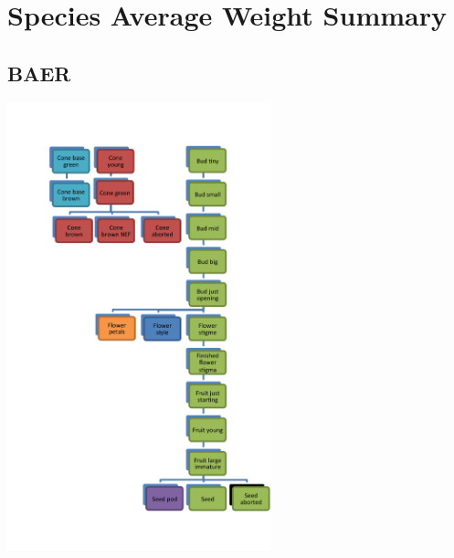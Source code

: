 \documentclass[10pt]{book} %
\begin{document}
\chapter{Species Average Weight Summary}
\newpage
\footnotesize



\clearpage
\newpage
\section{BAER}
\begin{multicols}{2}
\includegraphics[width=3in]{images/BAER.png}
\vfill
\columnbreak

\end{multicols}



\clearpage
\newpage
\end{document}
